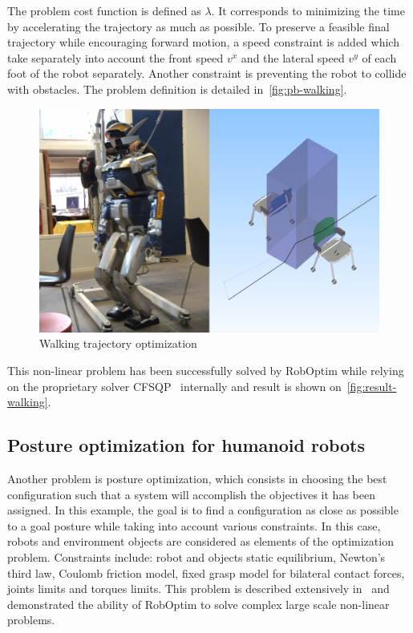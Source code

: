 \documentclass[conference,final,a4paper,twocolumn,9pt]{IEEEtran}
\begin{document}
The problem cost function is defined as $\lambda$. It corresponds to
minimizing the time by accelerating the trajectory as much as
possible. To preserve a feasible final trajectory while encouraging
forward motion, a speed constraint is added which take separately into
account the front speed $v^x$ and the lateral speed $v^y$ of each foot
of the robot separately. Another constraint is preventing the robot to
collide with obstacles. The problem definition is detailed
in~\autoref{fig:pb-walking}.


\begin{figure}[ht!]
  \begin{center}
    \includegraphics[width=\linewidth]{hrp2-two-chairs.png}
    \caption{Walking trajectory optimization\label{fig:result-walking}}
  \end{center}
\end{figure}


This non-linear problem has been successfully solved by RobOptim while
relying on the proprietary solver CFSQP~\cite{cfsqp} internally and
result is shown on~\autoref{fig:result-walking}.


\subsection{Posture optimization for humanoid robots}


Another problem is posture optimization, which consists in choosing
the best configuration such that a system will accomplish the
objectives it has been assigned. In this example, the goal is to find
a configuration as close as possible to a goal posture while taking
into account various constraints. In this case, robots and environment
objects are considered as elements of the optimization
problem. Constraints include: robot and objects static equilibrium,
Newton's third law, Coulomb friction model, fixed grasp model for
bilateral contact forces, joints limits and torques limits. This
problem is described extensively
in~\cite{Bouyarmane2011a,Bouyarmane2010} and demonstrated the ability
of RobOptim to solve complex large scale non-linear problems.
\end{document}
